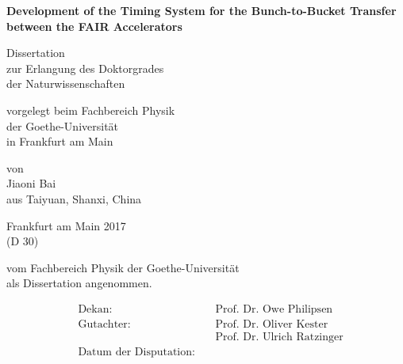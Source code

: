 \documentclass[12pt,twoside]{report}
\renewcommand{\_}{%
  \textunderscore\hspace{0pt}%
}
\begin{document}
\begin{center}
\thispagestyle{empty}

	 \vspace* {2cm}
	 \LARGE \textbf{Development of the Timing System for the Bunch-to-Bucket Transfer between the FAIR Accelerators }\par
	 \vspace{2cm}
    	 \vspace{2cm}

{ \normalsize  Dissertation\\
	zur Erlangung des Doktorgrades\\
	der Naturwissenschaften
\par}
    \vspace{2cm}

{ \normalsize vorgelegt beim Fachbereich Physik\\
der Goethe-Universit\"at\\
in Frankfurt am Main\par}
    \vspace{2cm}

{ \normalsize von\\
	Jiaoni Bai\\
	aus Taiyuan, Shanxi, China\par}
    \vspace{2cm}

    \vspace{2cm}
{ \normalsize Frankfurt am Main 2017\\
	(D 30)\par}
\end{center}

\clearpage
\thispagestyle{empty}
\begin{flushleft}
	 \vspace* {6cm}
{ \normalsize vom Fachbereich Physik der Goethe-Universit\"at\\
    \vspace{0.5cm}
	als Dissertation angenommen.}\par
    \vspace{4cm}
	


		
	\normalsize
	\begin{align*}
		 &\text{Dekan: }\:  &&\text{Prof. Dr. Owe Philipsen}\\[0.5cm]
		 &\text{Gutachter:}\: &&\text{Prof. Dr. Oliver Kester}\\[0.5cm]
		 &						&&\text{Prof. Dr. Ulrich Ratzinger}\\[0.5cm]
		 &\text{Datum der Disputation:}\: &&\text{} \\[0.5cm]
\end{align*}
\end{flushleft}    
\end{document}
